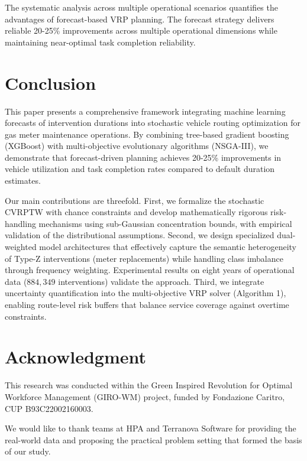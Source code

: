 \documentclass[preprint,12pt]{elsarticle}
\begin{document}
The systematic analysis across multiple operational scenarios quantifies the advantages of forecast-based VRP planning. The forecast strategy delivers reliable 20-25\% improvements across multiple operational dimensions while maintaining near-optimal task completion reliability. 








\section{Conclusion}
\label{sec:conclusion}

This paper presents a comprehensive framework integrating machine learning forecasts of intervention durations into stochastic vehicle routing optimization for gas meter maintenance operations. By combining tree-based gradient boosting (XGBoost) with multi-objective evolutionary algorithms (NSGA-III), we demonstrate that forecast-driven planning achieves 20-25\% improvements in vehicle utilization and task completion rates compared to default duration estimates. 


Our main contributions are threefold. First, we formalize the stochastic CVRPTW with chance constraints and develop mathematically rigorous risk-handling mechanisms using sub-Gaussian concentration bounds, with empirical validation of the distributional assumptions. Second, we design specialized dual-weighted model architectures that effectively capture the semantic heterogeneity of Type-Z interventions (meter replacements) while handling class imbalance through frequency weighting. Experimental results on eight years of operational data ($884,349$ interventions) validate the approach. Third, we integrate uncertainty quantification into the multi-objective VRP solver (Algorithm 1), enabling route-level risk buffers that balance service coverage against overtime constraints.








\section*{Acknowledgment}
This research was conducted within the Green Inspired Revolution for Optimal Workforce Management (GIRO-WM) project, funded by Fondazione Caritro, CUP B93C22002160003.

We would like to thank teams at HPA and Terranova Software for providing the real-world data and proposing the practical problem setting that formed the basis of our study. 
\end{document}

